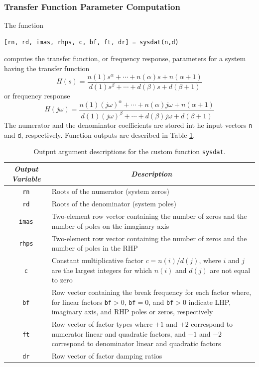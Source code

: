 \subsubsection{Transfer Function Parameter Computation}
The function
\begin{verbatim}
[rn, rd, imas, rhps, c, bf, ft, dr] = sysdat(n,d)
\end{verbatim}
computes the transfer function, or frequency response, parameters for a system having the transfer function
\begin{equation*}
    H(s) = \frac{n(1)s^\alpha + \cdots + n(\alpha)s + n(\alpha+1)}{
        d(1)s^\beta + \cdots + d(\beta)s + d(\beta+1)}
\end{equation*}
or frequency response
\begin{equation*}
    H(j\omega) = \frac{n(1)(j\omega)^\alpha + \cdots + n(\alpha)j\omega +
        n(\alpha+1)}{d(1)(j\omega)^\beta + \cdots + d(\beta)j\omega +
        d(\beta+1)}
\end{equation*}
The numerator and the denominator coefficients are stored int he input vectors \verb=n= and \verb=d=, respectively.  Function outputs are described in Table \ref{tab.matlab.transfunccomp}.

\begin{table}[bht]
\centering
\renewcommand{\arraystretch}{1.3}
\begin{tabular}{c | p{}}
    \textit{Output Variable}& \multicolumn{1}{c}{\textit{Description}}\\ \hline \hline
    \texttt{rn}     &   Roots of the numerator (system zeros) \\
    \texttt{rd}     &   Roots of the denominator (system poles) \\
    \texttt{imas}   &   Two-element row vector containing the number of zeros
                        and the number of poles on the imaginary axis   \\
    \texttt{rhps}   &   Two-element row vector containing the number of zeros
                        and the number of poles in the RHP  \\
    \texttt{c}      &   Constant multiplicative factor $c=n(i)/d(j)$,
                        where $i$ and $j$ are the largest integers for which $n(i)$ and $d(j)$ are not equal to zero \\
    \texttt{bf}     &   Row vector containing the break frequency for each
                        factor where, for linear factors \texttt{bf}$>0$, \texttt{bf}$=0$, and \texttt{bf}$>0$ indicate LHP, imaginary axis, and RHP poles or zeros, respectively\\
    \texttt{ft}     &   Row vector of factor types where $+1$ and $+2$
                        correspond to numerator linear and quadratic factors, and $-1$ and $-2$ correspond to denominator linear and quadratic factors   \\
    \texttt{dr}     &   Row vector of factor damping ratios
\end{tabular}
\caption{\footnotesize
        Output argument descriptions for the custom function \texttt{sysdat}.
        \label{tab.matlab.transfunccomp}
        }
\end{table}


